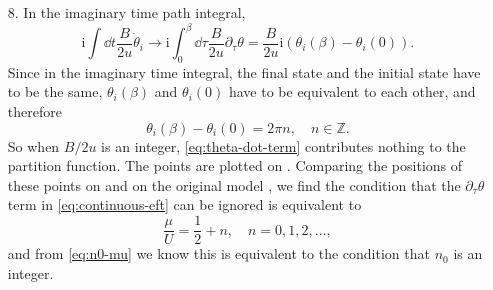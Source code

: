 \documentclass[hyperref, a4paper]{article}
\newcommand*{\ii}{\mathrm{i}}
\begin{document}
\begin{itemize}
\item[8.] In the imaginary time path integral,
\begin{equation}
    \ii \int \dd{t} \frac{B}{2u} \dot{\theta}_i \longrightarrow 
    \ii \int_0^{\beta} \dd{\tau} \frac{B}{2u} \partial_\tau \theta 
    = \frac{B}{2u} \ii (\theta_i(\beta) - \theta_i(0)).
    \label{eq:theta-dot-term}
\end{equation}
Since in the imaginary time integral,
the final state and the initial state have to be the same,
$\theta_i(\beta)$ and $\theta_i(0)$ have to be equivalent to each other,
and therefore 
\begin{equation}
    \theta_i(\beta) - \theta_i(0) = 2\pi n, \quad n \in \mathbb{Z}.
\end{equation}
So when $B / 2u$ is an integer, \eqref{eq:theta-dot-term} contributes nothing to the partition function.
The points are plotted on .
Comparing the positions of these points on  and
on the original model ,
we find the condition that the $\partial_\tau \theta$ term in \eqref{eq:continuous-eft} can be ignored 
is equivalent to 
\[
    \frac{\mu}{U} = \frac{1}{2} + n, \quad n = 0, 1, 2, \ldots,
\]
and from \eqref{eq:n0-mu} we know this is equivalent to the condition that $n_0$ is an integer.

\end{itemize}



\end{document}
